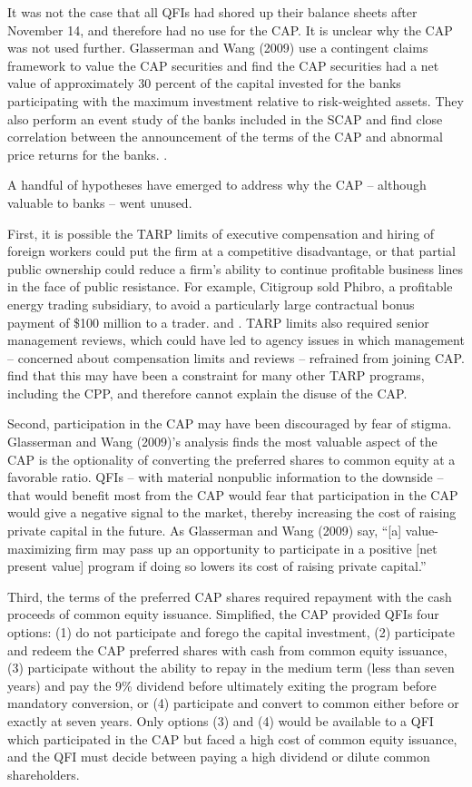\documentclass[12pt]{article}
\begin{document}
It was not the case that all QFIs had shored up their balance sheets after November 14, and therefore had no use for the CAP. It is unclear why the CAP was not used further. Glasserman and Wang (2009) use a contingent claims framework to value the CAP securities and find the CAP securities had a net value of approximately 30 percent of the capital invested for the banks participating with the maximum investment relative to risk-weighted assets.  They also perform an event study of the banks included in the SCAP and find close correlation between the announcement of the terms of the CAP and abnormal price returns for the banks. \citep{GW}.

A handful of hypotheses have emerged to address why the CAP -- although valuable to banks -- went unused.


First, it is possible the TARP limits of executive compensation and hiring of foreign workers could put the firm at a competitive disadvantage, or that partial public ownership could reduce a firm's ability to continue profitable business lines in the face of public resistance. For example, Citigroup sold Phibro, a profitable energy trading subsidiary, to avoid a particularly large contractual bonus payment of \$100 million to a trader. \citep{GW} and \citep{Dash}. TARP limits also required senior management reviews, which could have led to agency issues in which management -- concerned about compensation limits and reviews -- refrained from joining CAP. \citet{GW} find that this may have been a constraint for many other TARP programs, including the CPP, and therefore cannot explain the disuse of the CAP.


Second, participation in the CAP may have been discouraged by fear of stigma. Glasserman and Wang (2009)'s analysis finds the most valuable aspect of the CAP is the optionality of converting the preferred shares to common equity at a favorable ratio. QFIs -- with material nonpublic information to the downside -- that would benefit most from the CAP would fear that participation in the CAP would give a negative signal to the market, thereby increasing the cost of raising private capital in the future. As Glasserman and Wang (2009) say, “[a] value-maximizing firm may pass up an opportunity to participate in a positive [net present value] program if doing so lowers its cost of raising private capital.''


Third, the terms of the preferred CAP shares required repayment with the cash proceeds of common equity issuance. Simplified, the CAP provided QFIs four options: (1) do not participate and forego the capital investment, (2) participate and redeem the CAP preferred shares with cash from common equity issuance, (3) participate without the ability to repay in the medium term (less than seven years) and pay the 9\% dividend before ultimately exiting the program before mandatory conversion, or (4) participate and convert to common either before or exactly at seven years. Only options (3) and (4) would be available to a QFI which participated in the CAP but faced a high cost of common equity issuance, and the QFI must decide between paying a high dividend or dilute common shareholders.
\end{document}
